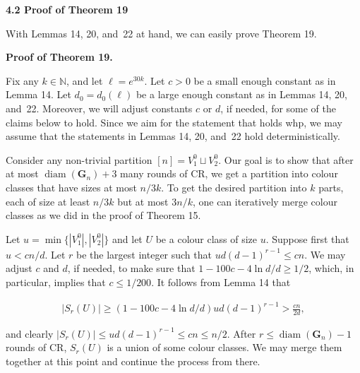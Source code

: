 \documentclass[10pt,a4paper]{article}
\begin{document}
\par\medskip\noindent\textbf{
4.2 Proof of Theorem 19
}\par




With Lemmas 14, 20, and 22 at hand, we can easily prove Theorem 19.\par




\par\medskip\noindent\textbf{Proof of Theorem 19.}\par




Fix any $k\in\mathbb{N}$, and let $\ell=e^{30k}$. Let $c>0$ be a small enough constant as in Lemma 14. Let $d_{0}=d_{0}(\ell)$ be a large enough constant as in Lemmas 14, 20, and 22. Moreover, we will adjust constants $c$ or $d$, if needed, for some of the claims below to hold. Since we aim for the statement that holds whp, we may assume that the statements in Lemmas 14, 20, and 22 hold deterministically.\par




Consider any non-trivial partition $[n]=V_{1}^{0}\sqcup V_{2}^{0}$. Our goal is to show that after at most $\operatorname{diam}(\mathbf{G}_{n})+3$ many rounds of CR, we get a partition into colour classes that have sizes at most $n/3k$. To get the desired partition into $k$ parts, each of size at least $n/3k$ but at most $3n/k$, one can iteratively merge colour classes as we did in the proof of Theorem 15.\par




Let $u=\min\{|V_{1}^{0}|,|V_{2}^{0}|\}$ and let $U$ be a colour class of size $u$. Suppose first that $u<cn/d$. Let $r$ be the largest integer such that $ud(d-1)^{r-1}\leq cn$. We may adjust $c$ and $d$, if needed, to make sure that $1-100c-4\ln d/d\geq 1/2$, which, in particular, implies that $c\leq 1/200$. It follows from Lemma 14 that\par


\[\begin{gathered}
|S_{r}(U)|\geq(1-100c-4\ln d/d)ud(d-1)^{r-1}>\frac{cn}{2d},
\end{gathered}\]


and clearly $|S_{r}(U)|\leq ud(d-1)^{r-1}\leq cn\leq n/2$. After $r\leq\operatorname{diam}(\mathbf{G}_{n})-1$ rounds of CR, $S_{r}(U)$ is a union of some colour classes. We may merge them together at this point and continue the process from there.\par
\end{document}
